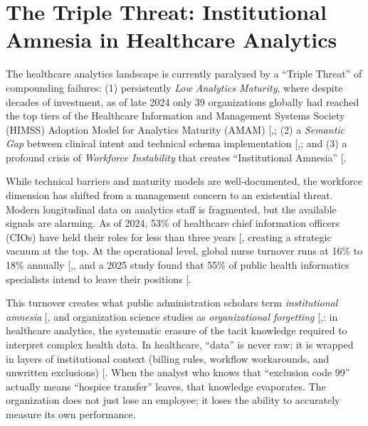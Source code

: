 \documentclass[
  american,
  11pt,
  letterpaper,
  oneside  ,captions=tableheading
]{scrartcl}
\begin{document}
\section{The Triple Threat: Institutional Amnesia in Healthcare
Analytics}\label{the-triple-threat-institutional-amnesia-in-healthcare-analytics}

The healthcare analytics landscape is currently paralyzed by a ``Triple
Threat'' of compounding failures: (1) persistently \emph{Low Analytics
Maturity}, where despite decades of investment, as of late 2024 only 39
organizations globally had reached the top tiers of the Healthcare
Information and Management Systems Society (HIMSS) Adoption Model for
Analytics Maturity (AMAM)
{[},\citeproc{ref-himss2024news}{2}{]}; (2) a
\emph{Semantic Gap} between clinical intent and technical schema
implementation
{[},\citeproc{ref-zhang2024}{4}{]}; and (3) a
profound crisis of \emph{Workforce Instability} that creates
``Institutional Amnesia'' {[}\citeproc{ref-hong2025}{5}{]}.

While technical barriers and maturity models are well-documented, the
workforce dimension has shifted from a management concern to an
existential threat. Modern longitudinal data on analytics staff is
fragmented, but the available signals are alarming. As of 2024, 53\% of
healthcare chief information officers (CIOs) have held their roles for
less than three years {[}\citeproc{ref-wittkieffer2024}{6}{]}, creating
a strategic vacuum at the top. At the operational level, global nurse
turnover runs at 16\% to 18\% annually
{[},\citeproc{ref-wu2024}{8}{]}, and a 2025
study found that 55\% of public health informatics specialists intend to
leave their positions {[}\citeproc{ref-rajamani2025}{9}{]}.

This turnover creates what public administration scholars term
\emph{institutional amnesia}
{[},\citeproc{ref-stark2019}{11}{]} and
organization science studies as \emph{organizational forgetting}
{[},\citeproc{ref-rao2006}{13}{]}: in
healthcare analytics, the systematic erasure of the tacit knowledge
required to interpret complex health data. In healthcare, ``data'' is
never raw; it is wrapped in layers of institutional context (billing
rules, workflow workarounds, and unwritten exclusions)
{[}\citeproc{ref-gitelman2013}{14}{]}. When the analyst who knows that
``exclusion code 99'' actually means ``hospice transfer'' leaves, that
knowledge evaporates. The organization does not just lose an employee;
it loses the ability to accurately measure its own performance.
\end{document}
